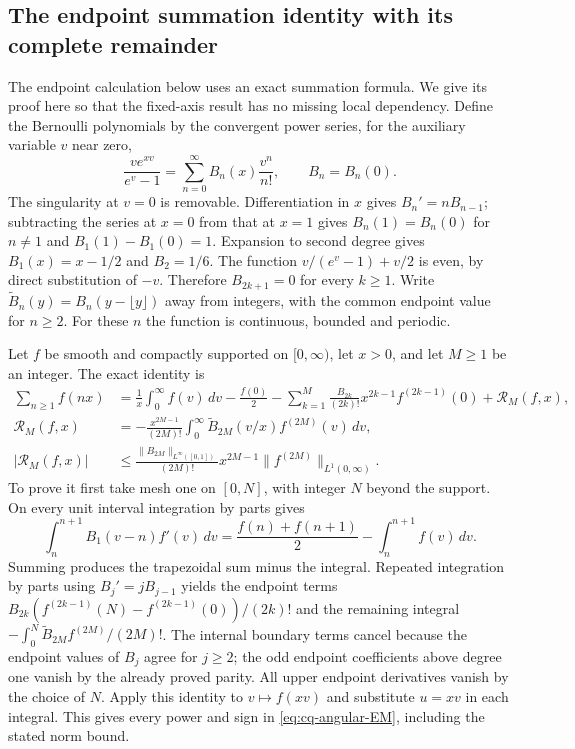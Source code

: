 \subsection{The endpoint summation identity with its complete remainder}
\label{sec:cq-angular-EM-proof}

The endpoint calculation below uses an exact summation formula.
We give its proof here so that the fixed-axis result has no missing
local dependency. Define the Bernoulli polynomials by the convergent
power series, for the auxiliary variable $v$ near zero,
\[
 \frac{ve^{xv}}{e^v-1}=\sum_{n=0}^\infty B_n(x)\frac{v^n}{n!},
 \qquad B_n=B_n(0).
\]
The singularity at $v=0$ is removable. Differentiation in $x$ gives
$B_n'=nB_{n-1}$; subtracting the series at $x=0$ from that at
$x=1$ gives $B_n(1)=B_n(0)$ for $n\ne1$ and
$B_1(1)-B_1(0)=1$. Expansion to second degree gives
$B_1(x)=x-1/2$ and $B_2=1/6$.
The function $v/(e^v-1)+v/2$ is even, by direct substitution
of $-v$. Therefore $B_{2k+1}=0$ for every $k\geq1$.
Write $\widetilde B_n(y)=B_n(y-\lfloor y\rfloor)$ away
from integers, with the common endpoint value for $n\geq2$.
For these $n$ the function is continuous, bounded and periodic.

Let $f$ be smooth and compactly supported on $[0,\infty)$,
let $x>0$, and let $M\geq1$ be an integer. The exact identity is
\begin{equation}
\begin{split}
 \sum_{n\geq1}f(nx)
 &=\frac1x\int_0^\infty f(v)\,dv-\frac{f(0)}2
 -\sum_{k=1}^M\frac{B_{2k}}{(2k)!}
                         x^{2k-1}f^{(2k-1)}(0)+\mathcal R_M(f,x),\\
 \mathcal R_M(f,x)
 &=-\frac{x^{2M-1}}{(2M)!}
    \int_0^\infty\widetilde B_{2M}(v/x)f^{(2M)}(v)\,dv,\\
 |\mathcal R_M(f,x)|
 &\leq\frac{\|B_{2M}\|_{L^\infty([0,1])}}{(2M)!}
                          x^{2M-1}\|f^{(2M)}\|_{L^1(0,\infty)}.
\end{split}
\label{eq:cq-angular-EM}
\end{equation}
To prove it first take mesh one on $[0,N]$, with integer $N$
beyond the support. On every unit interval integration by parts gives
\[
 \int_n^{n+1} B_1(v-n)f'(v)\,dv
 =\frac{f(n)+f(n+1)}2-\int_n^{n+1}f(v)\,dv.
\]
Summing produces the trapezoidal sum minus the integral.
Repeated integration by parts using $B_j'=jB_{j-1}$ yields
the endpoint terms $B_{2k}(f^{(2k-1)}(N)-f^{(2k-1)}(0))/(2k)!$
and the remaining integral
$-\int_0^N\widetilde B_{2M}f^{(2M)}/(2M)!$.
The internal boundary terms cancel because the endpoint values
of $B_j$ agree for $j\geq2$; the odd endpoint coefficients
above degree one vanish by the already proved parity.
All upper endpoint derivatives vanish by the choice of $N$.
Apply this identity to $v\mapsto f(xv)$ and substitute $u=xv$
in each integral. This gives every power and sign in
\eqref{eq:cq-angular-EM}, including the stated norm bound.

